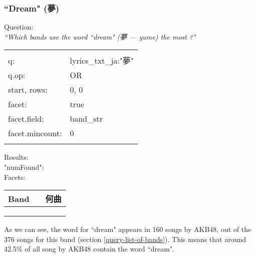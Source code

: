 \newpage


\subsubsection{``Dream" (夢)} \label{word-usage-dream}

Question: \\
\emph{``Which bands use the word ``dream" (夢 --- yume) the most ?"} \\


\begin{tabular}{|l|l|}
	\hline
	& \\
	q: & lyrics\_txt\_ja:"夢" \\
	q.op: & OR \\
	start, rows: & 0, 0 \\
	facet: & true \\
	facet.field: & band\_str \\
	facet.mincount: & 0 \\
	& \\
	\hline
\end{tabular}


\bigskip
Results: \\

"numFound": 
 \\

Facets:

\begin{longtable}{|l l|r|}
	\hline
	\multicolumn{1}{|c}{Band} & & 何曲\\
	\hline
	& & \\
	\endfirsthead
	
	\hline
	& & \\
	\endhead
	
	\hline
	\endfoot
	
	
	& & \\
\end{longtable}


\bigskip
\bigskip
\bigskip


As we can see, the word for ``dream" appears in 160 songs by AKB48, out of the 376 songs for this band (section \ref{query-list-of-bands}). This means that around 42.5\% of all song by AKB48 contain the word ``dream".  \\

